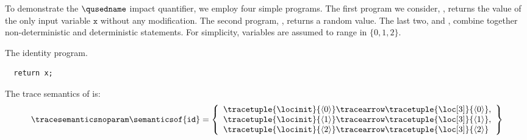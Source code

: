 \begin{example}
  To demonstrate the $\qusedname$ impact quantifier, we employ four simple programs.
  The first program we consider, , returns the value of the only input variable $\texttt{x}$ without any modification.
  The second program, , returns a random value.
  The last two,  and , combine together non-deterministic and deterministic statements.
  For simplicity, variables are assumed to range in $\{0, 1, 2\}$.

  \begin{marginlisting}[*-2]
    \caption{The identity program.}
    \vspace{15pt}
  \begin{lstlisting}[style=mystyle,language=customPython, escapechar=\%]
%\textcolor{black}{id}%(x):
  return x;
 \end{lstlisting}
  \end{marginlisting}
  The trace semantics of  is:
  \begin{align*}
    \tracesemanticsnoparam\semanticsof{\texttt{id}}
    =
    \left\{
      \begin{array}{l}
        \tracetuple{\locinit}{\langle 0\rangle}\tracearrow\tracetuple{\loc[3]}{\langle 0\rangle},\\
        \tracetuple{\locinit}{\langle 1\rangle}\tracearrow\tracetuple{\loc[3]}{\langle 1\rangle},\\
        \tracetuple{\locinit}{\langle 2\rangle}\tracearrow\tracetuple{\loc[3]}{\langle 2\rangle}
      \end{array}
    \right\}
  \end{align*}
  \begin{marginfigure}[*-4]
\end{marginfigure}
\end{example}

